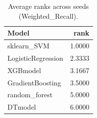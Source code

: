 \begin{table}[t]
\centering
\begin{tabular}{lr}
\toprule
Model & rank \\
\midrule
sklearn_SVM & 1.0000 \\
LogisticRegression & 2.3333 \\
XGBmodel & 3.1667 \\
GradientBoosting & 3.5000 \\
random_forest & 5.0000 \\
DTmodel & 6.0000 \\
\bottomrule
\end{tabular}
\caption{Average ranks across seeds (Weighted_Recall).}
\label{tab:avg_rank_Weighted_Recall}
\end{table}